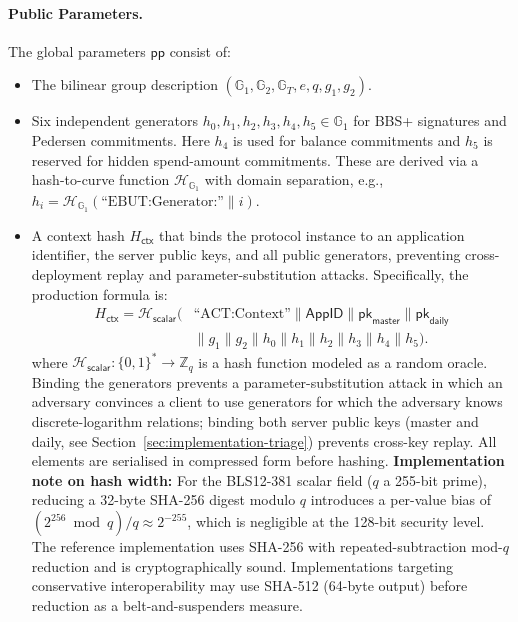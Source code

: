 \documentclass[11pt]{article}
\theoremstyle{definitionstyle}
\theoremstyle{plain}
\begin{document}
\paragraph{Public Parameters.}
The global parameters $\mathsf{pp}$ consist of:
\begin{itemize}
\item The bilinear group description $(\mathbb{G}_1,\mathbb{G}_2,\mathbb{G}_T,e,q,g_1,g_2)$.
\item Six independent generators $h_0, h_1, h_2, h_3, h_4, h_5 \in \mathbb{G}_1$ for BBS+ signatures and Pedersen commitments. Here $h_4$ is used for balance commitments and $h_5$ is reserved for hidden spend-amount commitments. These are derived via a hash-to-curve function $\mathcal{H}_{\mathbb{G}_1}$ with domain separation, e.g., $h_i = \mathcal{H}_{\mathbb{G}_1}(\text{``EBUT:Generator:''} \parallel i)$.
\item A context hash $H_{\mathsf{ctx}}$ that binds the protocol instance to an application identifier, the server public keys, and all public generators, preventing cross-deployment replay and parameter-substitution attacks. Specifically, the production formula is:
  \[
  \begin{aligned}
  H_{\mathsf{ctx}} = \mathcal{H}_{\mathsf{scalar}}\!\bigl(
    &\text{``ACT:Context''} \parallel \mathsf{AppID}
    \parallel \mathsf{pk}_{\mathsf{master}} \parallel \mathsf{pk}_{\mathsf{daily}} \\
    &\parallel g_1 \parallel g_2
    \parallel h_0 \parallel h_1 \parallel h_2 \parallel h_3 \parallel h_4 \parallel h_5
  \bigr).
  \end{aligned}
  \]
  where $\mathcal{H}_{\mathsf{scalar}}: \{0,1\}^* \to \mathbb{Z}_q$ is a hash function modeled as a random oracle. Binding the generators prevents a parameter-substitution attack in which an adversary convinces a client to use generators for which the adversary knows discrete-logarithm relations; binding both server public keys (master and daily, see Section~\ref{sec:implementation-triage}) prevents cross-key replay. All elements are serialised in compressed form before hashing. \textbf{Implementation note on hash width:} For the BLS12-381 scalar field ($q$ a 255-bit prime), reducing a 32-byte SHA-256 digest modulo $q$ introduces a per-value bias of $(2^{256} \bmod q)/q \approx 2^{-255}$, which is negligible at the 128-bit security level. The reference implementation uses SHA-256 with repeated-subtraction mod-$q$ reduction and is cryptographically sound. Implementations targeting conservative interoperability may use SHA-512 (64-byte output) before reduction as a belt-and-suspenders measure.
\end{itemize}
\end{document}
